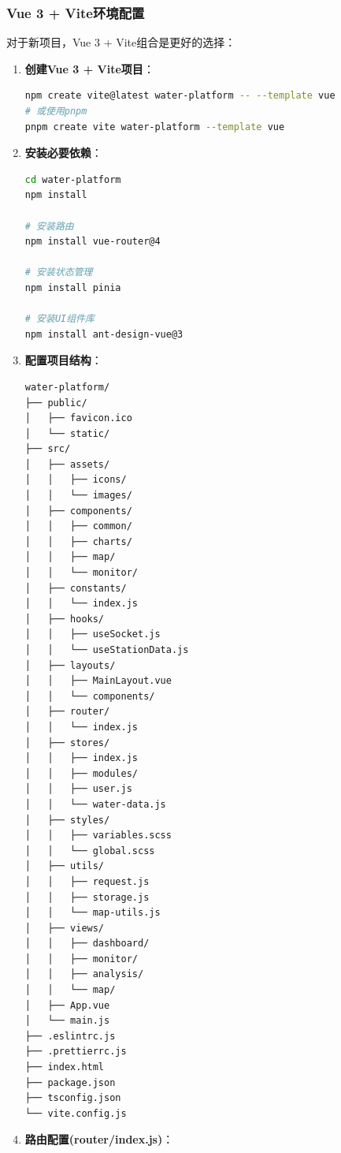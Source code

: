 \subsubsection{Vue 3 +
Vite环境配置}\label{vue-3-viteux73afux5883ux914dux7f6e}

对于新项目，Vue 3 + Vite组合是更好的选择：

\begin{enumerate}
\def\labelenumi{\arabic{enumi}.}
\item
  \textbf{创建Vue 3 + Vite项目}：

\begin{lstlisting}[language=bash]
npm create vite@latest water-platform -- --template vue
# 或使用pnpm
pnpm create vite water-platform --template vue
\end{lstlisting}
\item
  \textbf{安装必要依赖}：

\begin{lstlisting}[language=bash]
cd water-platform
npm install

# 安装路由
npm install vue-router@4

# 安装状态管理
npm install pinia

# 安装UI组件库
npm install ant-design-vue@3
\end{lstlisting}
\item
  \textbf{配置项目结构}：

\begin{lstlisting}
water-platform/
├── public/
│   ├── favicon.ico
│   └── static/
├── src/
│   ├── assets/
│   │   ├── icons/
│   │   └── images/
│   ├── components/
│   │   ├── common/
│   │   ├── charts/
│   │   ├── map/
│   │   └── monitor/
│   ├── constants/
│   │   └── index.js
│   ├── hooks/
│   │   ├── useSocket.js
│   │   └── useStationData.js
│   ├── layouts/
│   │   ├── MainLayout.vue
│   │   └── components/
│   ├── router/
│   │   └── index.js
│   ├── stores/
│   │   ├── index.js
│   │   ├── modules/
│   │   ├── user.js
│   │   └── water-data.js
│   ├── styles/
│   │   ├── variables.scss
│   │   └── global.scss
│   ├── utils/
│   │   ├── request.js
│   │   ├── storage.js
│   │   └── map-utils.js
│   ├── views/
│   │   ├── dashboard/
│   │   ├── monitor/
│   │   ├── analysis/
│   │   └── map/
│   ├── App.vue
│   └── main.js
├── .eslintrc.js
├── .prettierrc.js
├── index.html
├── package.json
├── tsconfig.json
└── vite.config.js
\end{lstlisting}
\item
  \textbf{路由配置(router/index.js)}：


\end{enumerate}
